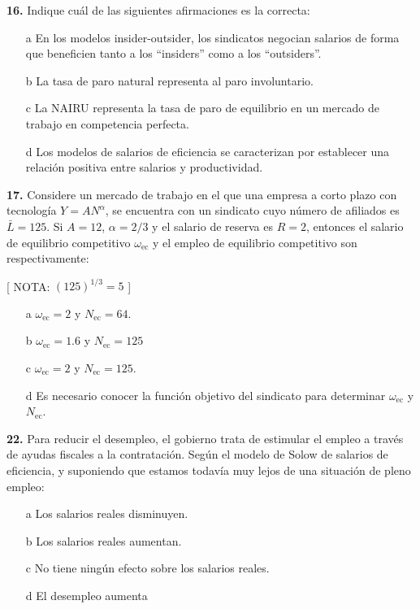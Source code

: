 \documentclass{nuevotema}
\begin{document}
\textbf{16.} Indique cuál de las siguientes afirmaciones es la correcta:

\begin{itemize}
	\item[a] En los modelos insider-outsider, los sindicatos negocian salarios de forma que beneficien tanto a los ``insiders'' como a los ``outsiders''.
	\item[b] La tasa de paro natural representa al paro involuntario.
	\item[c] La NAIRU representa la tasa de paro de equilibrio en un mercado de trabajo en competencia perfecta.
	\item[d] Los modelos de salarios de eficiencia se caracterizan por establecer una relación positiva entre salarios y productividad.
\end{itemize}


\textbf{17.} Considere un mercado de trabajo en el que una empresa a corto plazo con tecnología $Y=AN^\alpha$, se encuentra con un sindicato cuyo número de afiliados es $\bar{L}=125$. Si $A=12$, $\alpha = 2/3$ y el salario de reserva es $R=2$, entonces el salario de equilibrio competitivo $\omega_\text{ec}$ y el empleo de equilibrio competitivo son respectivamente:

[ NOTA: $(125)^{1/3} = 5$ ]

\begin{itemize}
	\item[a] $\omega_\text{ec} = 2$ y $N_\text{ec} = 64$.
	\item[b] $\omega_\text{ec} = 1.6$ y $N_\text{ec} = 125$
	\item[c] $\omega_\text{ec} = 2$ y $N_\text{ec} = 125$.
	\item[d] Es necesario conocer la función objetivo del sindicato para determinar $\omega_\text{ec}$ y $N_\text{ec}$.
\end{itemize}

\textbf{22.} Para reducir el desempleo, el gobierno trata de estimular el empleo a través de ayudas fiscales a la contratación. Según el modelo de Solow de salarios de eficiencia, y suponiendo que estamos todavía muy lejos de una situación de pleno empleo:

\begin{itemize}
	\item[a] Los salarios reales disminuyen.
	\item[b] Los salarios reales aumentan.
	\item[c] No tiene ningún efecto sobre los salarios reales.
	\item[d] El desempleo aumenta
\end{itemize}
\end{document}
